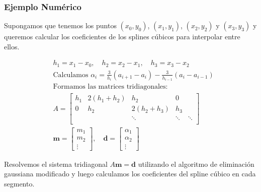 \documentclass{beamer}
\begin{document}
\begin{frame}
	\frametitle{Ejemplo Numérico}
	Supongamos que tenemos los puntos $(x_0, y_0)$, $(x_1, y_1)$, $(x_2, y_2)$ y $(x_3, y_3)$ y queremos calcular los coeficientes de los splines cúbicos para interpolar entre ellos.
	
	\begin{align*}
		&h_1 = x_1 - x_0, \quad h_2 = x_2 - x_1, \quad h_3 = x_3 - x_2 \\
		&\text{Calculamos } \alpha_i = \frac{3}{h_i}(a_{i+1} - a_i) - \frac{3}{h_{i-1}}(a_i - a_{i-1}) \\
		&\text{Formamos las matrices tridiagonales:} \\
		&A = \begin{bmatrix}
			h_1 & 2(h_1 + h_2) & h_2 & 0 \\
			0 & h_2 & 2(h_2 + h_3) & h_3 \\
			& & \ddots & \ddots & \ddots \\
		\end{bmatrix} \\
		&\mathbf{m} = \begin{bmatrix}
			m_1 \\
			m_2 \\
			\vdots
		\end{bmatrix}, \quad \mathbf{d} = \begin{bmatrix}
			\alpha_1 \\
			\alpha_2 \\
			\vdots
		\end{bmatrix}
	\end{align*}
\end{frame}

\begin{frame}
		Resolvemos el sistema tridiagonal $A \mathbf{m} = \mathbf{d}$ utilizando el algoritmo de eliminación gaussiana modificado y luego calculamos los coeficientes del spline cúbico en cada segmento.
\end{frame}
	
\end{document}
